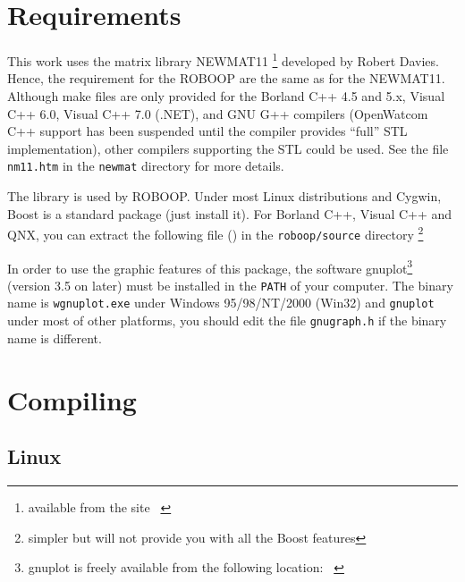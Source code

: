 \documentclass[dvips,11pt,fleqn]{report}
\begin{document}
\section{Requirements}

This work uses the matrix library \textsf{NEWMAT11}
\footnote{available from the site {\tt
    }}
developed by Robert Davies. Hence, the requirement for the
\textsf{ROBOOP} are the same as for the \textsf{NEWMAT11}. Although
make files are only provided for the\textsf{ Borland C++} 4.5 and 5.x,
\textsf{Visual C++} 6.0, \textsf{Visual C++} 7.0 (.NET),
and \textsf{GNU G++} compilers (\textsf{OpenWatcom C++} support has been
suspended until the compiler provides ``full'' STL implementation), other
compilers supporting the \textsf{STL} could be used.  See the file
{\tt nm11.htm} in the {\tt newmat} directory for more details.

The library 
is used by \textsf{ROBOOP}. Under most \textsf{Linux} distributions
and \textsf{Cygwin}, \textsf{Boost} is a standard package (just
install it). For Borland C++, \textsf{Visual C++} and \textsf{QNX},
you can extract the following file
()
in the \texttt{roboop/source} directory \footnote{simpler but will not
  provide you with all the \textsf{Boost} features}

In order to use the graphic features of this package, the software
\textsf{gnuplot}\footnote{ \textsf{gnuplot} is freely available from
  the following location: {\tt
    }
  } (version 3.5 on later) must be installed in the {\tt PATH} of your
computer. The binary name is {\tt wgnuplot.exe} under \textsf{Windows
  95/98/NT/2000} (Win32) and \texttt{gnuplot} under most of other
platforms, you should edit the file \texttt{gnugraph.h} if the
binary name is different.


\section{Compiling}

\subsection{Linux}
\end{document}
